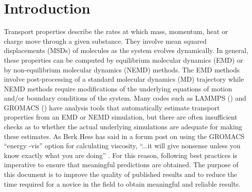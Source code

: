 \documentclass[9pt]{livecoms}
\begin{document}
\section{Introduction}

Transport properties describe the rates at which mass, momentum, heat or charge move through a given substance. They involve mean squared displacements (MSDs) of molecules as the system evolves dynamically. In general, these properties can be computed by equilibrium molecular dynamics (EMD) or by non-equilibrium molecular dynamics (NEMD) methods. The EMD methods involve post-processing of a standard molecular dynamics (MD) trajectory while NEMD methods require modifications of the underlying equations of motion and/or boundary conditions of the system. Many codes such as LAMMPS (\cite{LAMMPS}) and GROMACS (\cite{GROMACS}) have analysis tools that automatically estimate transport properties from an EMD or NEMD simulation, but there are often insufficient checks as to whether the actual underlying simulations are adequate for making these estimates. As Berk Hess has said in a forum post on using the GROMACS ``energy -vis'' option for calculating viscosity, ``...it will give nonsense unless you know exactly what you are doing'' \cite{HessForum}. For this reason, following best practices is imperative to ensure that meaningful predictions are obtained. The purpose of this document is to improve the quality of published results and to reduce the time required for a novice in the field to obtain meaningful and reliable results.
\end{document}
